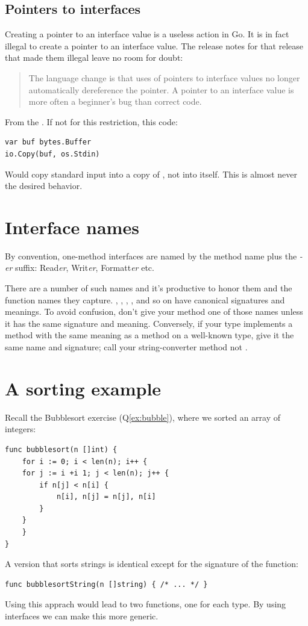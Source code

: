 \subsection{Pointers to interfaces}
Creating a pointer to an interface value is a useless action in Go.
 It is in fact illegal to
create a pointer to an interface value. The release notes for that release that
made them illegal leave no room for doubt:
\begin{quote}
The language change is that uses of pointers to interface values no longer 
automatically dereference the pointer.  A pointer to an interface value is more 
often a beginner's bug than correct code.
\end{quote}
From the \cite{go_faq}.  If not for this restriction, this code:
\begin{lstlisting}
var buf bytes.Buffer
io.Copy(buf, os.Stdin)
\end{lstlisting}
Would copy standard input into a copy of , not into  itself. 
This is almost never the desired behavior.

\section{Interface names}
By convention, one-method interfaces are named by the method name plus
the \emph{-er} suffix: Read\emph{er}, Writ\emph{er}, Formatt\emph{er} etc.

There are a number of such names and it's productive to honor them and
the function names they capture. , ,
, ,  and
so on have canonical signatures and meanings. To avoid confusion, don't
give your method one of those names unless it has the same signature and
meaning. Conversely, if your type implements a method with the same
meaning as a method on a well-known type, give it the same name and
signature; call your string-converter method  not
.

\section{A sorting example}
\label{sec:a sorting example}
Recall the Bubblesort exercise (Q\ref{ex:bubble}), where we sorted an
array of integers:
\begin{lstlisting}
func bubblesort(n []int) {
    for i := 0; i < len(n); i++ {
	for j := i +i 1; j < len(n); j++ {
	    if n[j] < n[i] {
		    n[i], n[j] = n[j], n[i]
	    }
	}
    }
}
\end{lstlisting}
A version that sorts strings is identical except for the signature of
the function:
\begin{lstlisting}
func bubblesortString(n []string) { /* ... */ }
\end{lstlisting}
Using this apprach would lead to two functions, one for each type. By using
interfaces we can make this more  generic.

